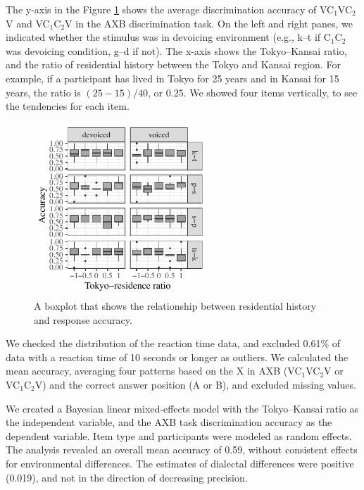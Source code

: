 \documentclass[a4paper,11pt,twocolumn]{article}
\begin{document}
The y-axis in the Figure \ref{fig:axb_results} shows the average discrimination accuracy of VC$_\text{1}$VC$_\text{2}$V and VC$_\text{1}$C$_\text{2}$V in the AXB discrimination task. On the left and right panes, we indicated whether the stimulus was in devoicing environment (e.g., k--t if C$_\text{1}$C$_\text{2}$ was devoicing condition, g--d if not). The x-axis shows the Tokyo--Kansai ratio, and the ratio of residential history between the Tokyo and Kansai region. For example, if a participant has lived in Tokyo for 25 years and in Kansai for 15 years, the ratio is $(25-15)/40$, or $0.25$. We showed four items vertically, to see the tendencies for each item.
\begin{figure}[!ht]
\begin{center}
\includegraphics[width=6.5cm]{../results/artifact/results_axb_allophone_gray.pdf}
\caption{A boxplot that shows the relationship between residential history and response accuracy.}\label{fig:axb_results}
\end{center}
\end{figure}

We checked the distribution of the reaction time data, and excluded 0.61\% of data with a reaction time of 10 seconds or longer as outliers. We calculated the mean accuracy, averaging four patterns based on the X in AXB (VC$_\text{1}$VC$_\text{2}$V or VC$_\text{1}$C$_\text{2}$V) and the correct answer position (A or B), and excluded missing values.

We created a Bayesian linear mixed-effects model \cite{lme4, rstanarm, easystats} with the Tokyo--Kansai ratio as the independent variable, and the AXB task discrimination accuracy as the dependent variable. Item type and participants were modeled as random effects. The analysis revealed an overall mean accuracy of 0.59, without consistent effects for environmental differences. The estimates of dialectal differences were positive (0.019), and not in the direction of decreasing precision.
\end{document}
